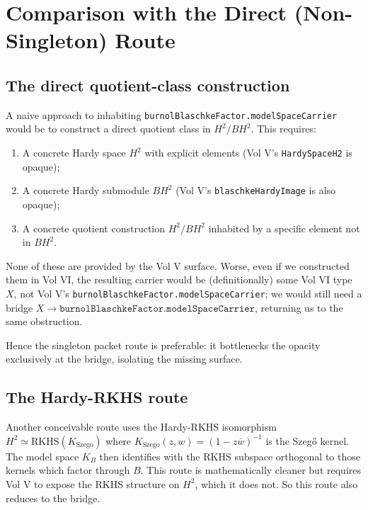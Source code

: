 \documentclass[12pt]{article}
\theoremstyle{definition}
\theoremstyle{remark}
\newcommand{\HardyTwo}{H^{2}}
\newcommand{\BurnolFactor}{B}
\begin{document}
\section{Comparison with the Direct (Non-Singleton) Route}\label{sec:comparison}

\subsection{The direct quotient-class construction}

A naive approach to inhabiting
\texttt{burnolBlaschkeFactor.modelSpaceCarrier} would be to construct a
direct quotient class in $\HardyTwo / \BurnolFactor\HardyTwo$. This
requires:
\begin{enumerate}
\item A concrete Hardy space $\HardyTwo$ with explicit elements (Vol V's
\texttt{HardySpaceH2} is opaque);
\item A concrete Hardy submodule
$\BurnolFactor\HardyTwo$ (Vol V's \texttt{blaschkeHardyImage} is also
opaque);
\item A concrete quotient construction
$\HardyTwo / \BurnolFactor\HardyTwo$ inhabited by a specific element
not in $\BurnolFactor\HardyTwo$.
\end{enumerate}
None of these are provided by the Vol V surface. Worse, even if we
constructed them in Vol VI, the resulting carrier would be (definitionally)
some Vol VI type $X$, not Vol V's
\texttt{burnolBlaschkeFactor.modelSpaceCarrier}; we would still need a
bridge $X\to \texttt{burnolBlaschkeFactor.modelSpaceCarrier}$, returning
us to the same obstruction.

Hence the singleton packet route is preferable: it bottlenecks the
opacity exclusively at the bridge, isolating the missing surface.

\subsection{The Hardy-RKHS route}

Another conceivable route uses the Hardy-RKHS isomorphism
$\HardyTwo \simeq \mathrm{RKHS}(K_{\text{Szego}})$ where $K_{\text{Szego}}(z,w)
= (1-z\overline{w})^{-1}$ is the Szegő kernel. The model space $K_{B}$
then identifies with the RKHS subspace orthogonal to those kernels which
factor through $B$. This route is mathematically cleaner but requires Vol
V to expose the RKHS structure on $\HardyTwo$, which it does not. So this
route also reduces to the bridge.
\end{document}
